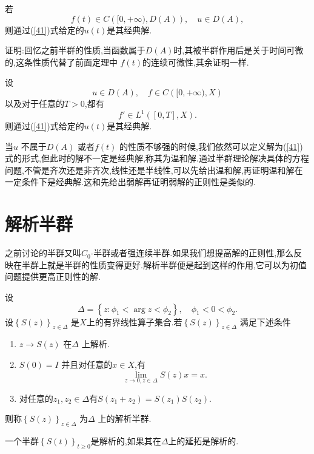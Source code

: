    \begin{corollary}
    若
    \[
      f(t)\in C\left( [0,+\infty),D(A) \right) , \quad u\in D(A),
    \] 
    则通过{\normalfont(\ref{41})}式给定的$u(t)$是其经典解.
   \end{corollary}
   证明:回忆之前半群的性质,当函数属于$D(A)$时,其被半群作用后是关于时间可微的,这条性质代替了前面定理中 $f(t)$的连续可微性,其余证明一样.
   \begin{corollary}
     设
     \[
       u\in D(A),\quad f\in C\left( [0,+\infty),X \right) 
     \] 
     以及对于任意的$T>0$,都有
      \[
	f' \in L^{1}\left( [0,T],X \right) .
     \] 
     则通过{\normalfont(\ref{41})}式给定的$u(t)$是其经典解.
   \end{corollary}


  当$u$ 不属于$D(A)$ 或者$f(t)$ 的性质不够强的时候,我们依然可以定义解为(\ref{41})式的形式,但此时的解不一定是经典解,称其为温和解.通过半群理论解决具体的方程问题,不管是齐次还是非齐次,线性还是半线性,可以先给出温和解,再证明温和解在一定条件下是经典解.这和先给出弱解再证明弱解的正则性是类似的.

\section{解析半群}
之前讨论的半群又叫$C_0$-半群或者强连续半群.如果我们想提高解的正则性,那么反映在半群上就是半群的性质变得更好.解析半群便是起到这样的作用,它可以为初值问题提供更高正则性的解.

  \begin{definition}
    设
    \[
    \Delta = \left\{z: \phi_1<\arg z <\phi_2\right\},\quad \phi_1<0<\phi_2. 
    \]
    设$\left\{S(z)\right\}_{z\in \Delta} $ 是$X$上的有界线性算子集合.若$\left\{S(z)\right\} _{z\in \Delta}$ 满足下述条件
    \begin{enumerate}
      \item $z\to S(z)$ 在$\Delta$ 上解析.
      \item $S(0)=I$ 并且对任意的$x\in X$,有
	\[
	  \lim_{z\to 0,z\in \Delta}S(z)x=x.
	\] 
      \item 对任意的$z_1,z_2\in \Delta$有$S(z_1+z_2)=S(z_1)S(z_2)$.
    \end{enumerate}
    则称$\left\{S(z)\right\} _{z\in \Delta}$ 为$\Delta$ 上的解析半群.
  \end{definition}
  一个半群$\left\{S(t)\right\} _{t\ge 0}$是解析的,如果其在$\Delta$上的延拓是解析的.


